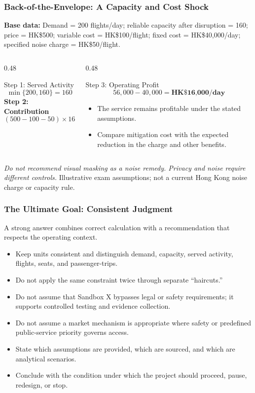 \documentclass{beamer}
\begin{document}
\begin{frame}[t,shrink=12]
\frametitle{Back-of-the-Envelope: A Capacity and Cost Shock}
\textbf{Base data:} Demand = 200 flights/day; reliable capacity after disruption = 160; price = HK\$500; variable cost = HK\$100/flight; fixed cost = HK\$40,000/day; specified noise charge = HK\$50/flight.
\begin{columns}[T]
\begin{column}{0.48\textwidth}\begin{block}{Step 1: Served Activity}
\[
\min\{200,160\}=160
\]
\textbf{Step 2: Contribution}
\[
(500-100-50)\times160
=\text{HK\$56,000}
\]
\end{block}\end{column}
\begin{column}{0.48\textwidth}\begin{block}{Step 3: Operating Profit}
\[
56{,}000-40{,}000
=\textbf{HK\$16,000/day}
\]
\begin{itemize}
\item The service remains profitable under the stated assumptions.
\item Compare mitigation cost with the expected reduction in the charge and other benefits.
\end{itemize}\end{block}\end{column}
\end{columns}
\textit{Do not recommend visual masking as a noise remedy. Privacy and noise require different controls.}
\vfill{\tiny Illustrative exam assumptions; not a current Hong Kong noise charge or capacity rule.}
\end{frame}

\begin{frame}[t]
\frametitle{The Ultimate Goal: Consistent Judgment}
A strong answer combines correct calculation with a recommendation that respects the operating context.
\begin{itemize}
\item Keep units consistent and distinguish demand, capacity, served activity, flights, seats, and passenger-trips.
\item Do not apply the same constraint twice through separate ``haircuts.''
\item Do not assume that Sandbox X bypasses legal or safety requirements; it supports controlled testing and evidence collection.
\item Do not assume a market mechanism is appropriate where safety or predefined public-service priority governs access.
\item State which assumptions are provided, which are sourced, and which are analytical scenarios.
\item Conclude with the condition under which the project should proceed, pause, redesign, or stop.
\end{itemize}
\end{frame}
\end{document}
